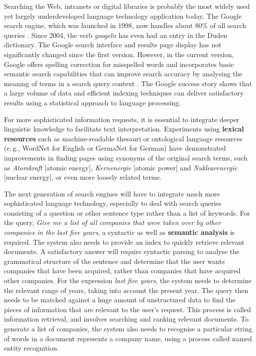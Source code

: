 \begin{multicols}{2}
Searching the Web, intranets or digital libraries is probably the most widely used yet largely underdeveloped language technology application today. The Google search engine, which was launched in 1998, now handles about 80\% of all search queries \cite{spi1}. Since 2004, the verb \textit{googeln} has even had an entry in the Duden dictionary. The Google search interface and results page display has not significantly changed since the first version. However, in the current version, Google offers spelling correction for misspelled words and incorporates basic semantic search capabilities that can improve search accuracy by analysing the meaning of terms in a search query context \cite{pc1}. The Google success story shows that a large volume of data and efficient indexing techniques can deliver satisfactory results using a statistical approach to language processing. 

For more sophisticated information requests, it is essential to integrate deeper linguistic knowledge to facilitate text interpretation. Experiments using \textbf{lexical resources} such as machine-readable thesauri or ontological language resources (e.\,g., WordNet for English or GermaNet for German) have demonstrated improvements in finding pages using synonyms of the original search terms, such as \textit{Atomkraft} {[}atomic energy{]}, \textit{Kernenergie} {[}atomic power{]} and \textit{Nuklearenergie} {[}nuclear energy{]}, or even more loosely related terms.


The next generation of search engines will have to integrate much more sophisticated language technology, especially to deal with search queries consisting of a question or other sentence type rather than a list of keywords. For the query, \textit{Give me a list of all companies that were taken over by other companies in the last five years}, a syntactic as well as \textbf{semantic analysis} is required. The system also needs to provide an index to quickly retrieve relevant documents. A satisfactory answer will require syntactic parsing to analyse the grammatical structure of the sentence and determine that the user wants companies that have been acquired, rather than companies that have acquired other companies. For the expression \textit{last five years}, the system needs to determine the relevant range of years, taking into account the present year. The query then needs to be matched against a huge amount of unstructured data to find the pieces of information that are relevant to the user’s request. This process is called information retrieval, and involves searching and ranking relevant documents. To generate a list of companies, the system also needs to recognise a particular string of words in a document represents a company name, using a process called named entity recognition.


\end{multicols}
